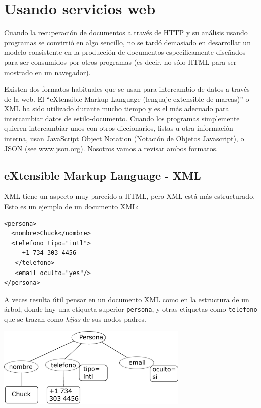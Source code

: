 
\chapter{Usando servicios web}

Cuando la recuperación de documentos a través de HTTP y su análisis usando programas se convirtió en algo sencillo,
no se tardó demasiado en desarrollar un modelo
consistente en la producción de
documentos específicamente diseñados para ser consumidos por otros
programas (es decir, no sólo HTML para ser mostrado en un navegador).

Existen dos formatos habituales que se usan para intercambio de datos a través de la web.
El ``eXtensible Markup Language (lenguaje extensible de marcas)'' o XML ha sido utilizado
durante mucho tiempo y es el más adecuado para intercambiar datos de estilo-documento.
Cuando los programas simplemente quieren intercambiar unos con otros diccionarios, listas u otra
información interna, usan JavaScript Object Notation (Notación de Objetos Javascript), o JSON
(see \url{www.json.org}). Nosotros vamos a revisar ambos formatos.

\section{eXtensible Markup Language - XML}

XML tiene un aspecto muy parecido a HTML, pero XML está más estructurado.
Esto es un ejemplo de un documento XML:

\beforeverb
\begin{verbatim}
<persona>
  <nombre>Chuck</nombre>
  <telefono tipo="intl">
     +1 734 303 4456
   </telefono>
   <email oculto="yes"/>
</persona>
\end{verbatim}
\afterverb
%
A veces resulta útil pensar en un documento XML como en la estructura de un árbol,
donde hay una etiqueta superior {\tt persona}, y otras etiquetas como {\tt telefono}
que se trazan como \emph{hijas} de sus nodos padres.

\beforefig
\centerline{\includegraphics[height=1.50in]{figs2/xml-tree.eps}}
\afterfig

